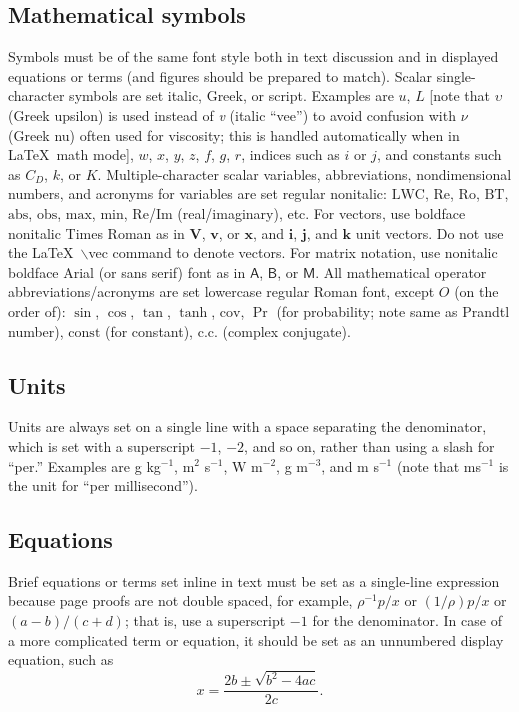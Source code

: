 \documentclass{ametsocV6.2}
\begin{document}
\subsection{Mathematical symbols}
Symbols must be of the same font style both in text discussion and in
displayed equations or terms (and figures should be prepared to match).
Scalar single-character symbols are set italic, Greek, or script. Examples
are $u$, $L$ [note that $\upsilon$ (Greek upsilon) is used instead of
\textit{v} (italic ``vee'') to avoid confusion with $\nu$ (Greek nu) often
used for viscosity; this is handled automatically when in \LaTeX\ math mode],
$w$, $x$, $y$, $z$, $f$, $g$, $r$, indices such as $i$ or $j$, and constants
such as $C_D$, $k$, or $K$. Multiple-character scalar variables,
abbreviations, nondimensional numbers, and acronyms for variables are set
regular nonitalic: $\mathrm{LWC}$, $\mathrm{Re}$, $\mathrm{Ro}$,
$\mathrm{BT}$, $\mathrm{abs}$, $\mathrm{obs}$, $\mathrm{max}$,
$\mathrm{min}$, $\mathrm{Re}$/$\mathrm{Im}$ (real/imaginary), etc. For
vectors, use boldface nonitalic Times Roman as in $\mathbf{V}$, $\mathbf{v}$,
or $\mathbf{x}$, and $\mathbf{i}$, $\mathbf{j}$, and $\mathbf{k}$ unit
vectors. Do not use the \LaTeX\ $\backslash$vec command to denote vectors.
For matrix notation, use nonitalic boldface Arial (or sans serif) font as in
$\bm{\mathsf{A}}$, $\bm{\mathsf{B}}$, or $\bm{\mathsf{M}}$.  All mathematical
operator abbreviations/acronyms are set lowercase regular Roman font, except
$O$ (on the order of): $\sin$, $\cos$, $\tan$, $\tanh$, $\mathrm{cov}$, $\Pr$
(for probability; note same as Prandtl number), $\mathrm{const}$ (for
constant), $\mathrm{c.c.}$ (complex conjugate).

\subsection{Units}
Units are always set on a single line with a space separating the
denominator, which is set with a superscript $-1$, $-2$, and so on, rather
than using a slash for ``per.'' Examples are g kg$^{-1}$, m$^2$ s$^{-1}$, W
m$^{-2}$, g m$^{-3}$, and m s$^{-1}$ (note that ms$^{-1}$ is the unit for
``per millisecond'').

\subsection{Equations}
Brief equations or terms set inline in text must be set as a single-line
expression because page proofs are not double spaced, for example,
$\rho^{-1}p/x$ or $(1/{\rho})p/x$ or $(a-b)/(c+d)$; that is, use a
superscript $-1$ for the denominator. In case of a more complicated term or
equation, it should be set as an unnumbered display equation, such as
\begin{displaymath} x=\frac{2b\pm\sqrt{b^{2}-4ac}}{2c}.  \end{displaymath}
\end{document}
